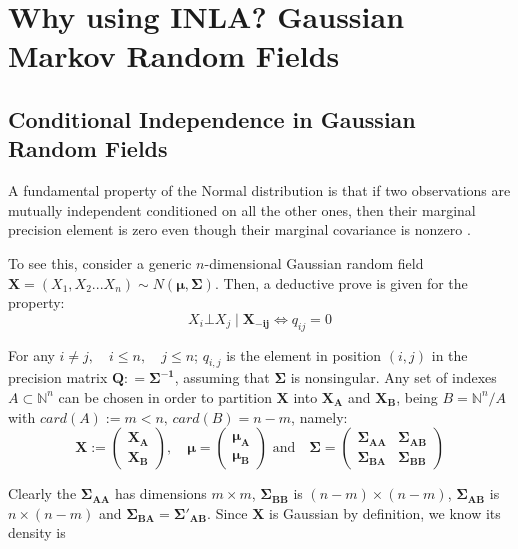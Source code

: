 \documentclass[openany]{book}
\begin{document}
\section[GMRFs]{Why using INLA? Gaussian Markov Random Fields}\label{section:GMRFs}

\subsection{Conditional Independence in Gaussian Random Fields}\label{par:GRFs}
A fundamental property of the Normal distribution is that if two observations are mutually independent conditioned on all the other ones, then their marginal precision element is zero even though their marginal covariance is nonzero \cite{GMRFs}.

To see this, consider a generic $n$-dimensional Gaussian random field $\mathbf{X} = (X_1, X_2 .. . X_n) \sim N(\mathbf{\mu}, \mathbf{\Sigma})$. Then, a deductive prove is given for the property:
\begin{equation}
		X_i \bot X_j \mid \mathbf{X_{-ij}} \iff q_{ij} = 0
		\label{eq:theorem1}
\end{equation}

For any $i \neq j,  \quad i \leq n, \quad j\leq n$; $q_{i,j}$ is the element in position $(i,j)$ in the precision matrix $\mathbf{Q}: = \mathbf{\Sigma^{-1}}$, assuming that $\mathbf{\Sigma}$ is nonsingular. Any set of indexes $A \subset \mathbb{N}^n$ can be chosen in order to partition $\mathbf{X}$ into $\mathbf{X_A}$ and $\mathbf{X_B}$, being $B = \mathbb{N}^n / A$ with $card(A) := m<n, \, card(B) = n-m$, namely:
	$$
	\mathbf{X} := \left( \begin{array}{l} \mathbf{X_A} \\ \mathbf{X_B}
		\end{array}
	\right)  , \quad 
		\mathbf{\mu} = \left( \begin{array}{l} \mathbf{\mu_A} \\ \mathbf{\mu_B}
	\end{array}
	\right)
	 \,\, \text{and} \quad 
	\mathbf{\Sigma} = \left( \begin{array}{ll} \mathbf{\Sigma_{AA}} & \mathbf{\Sigma_{AB}}
		 \\ \mathbf{\Sigma_{BA}} & \mathbf{\Sigma_{BB}}
	\end{array}
	\right)
	$$
    
Clearly the $\mathbf{\Sigma_{AA}}$ has dimensions $m \times m$, $\mathbf{\Sigma_{BB}}$ is $(n-m) \times (n-m)$,	$\mathbf{\Sigma_{AB}}$ is $n \times (n-m)$ and $\mathbf{\Sigma_{BA}} = \mathbf{\Sigma'_{AB}}$. 
Since $\mathbf{X}$ is Gaussian by definition, we know its density is
\end{document}
